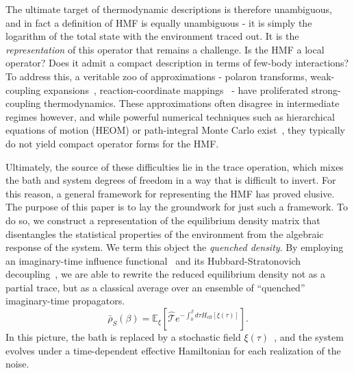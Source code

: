 The ultimate target of thermodynamic descriptions is therefore unambiguous, and in fact a definition of HMF is equally unambiguous - it is simply the logarithm of the total state with the environment traced out. It is the \emph{representation} of this operator that remains a challenge. Is the HMF a local operator? Does it admit a compact description in terms of few-body interactions? To address this, a veritable zoo of approximations - polaron transforms, weak-coupling expansions~\cite{cresserWeakUltrastrongCoupling2021a}, reaction-coordinate mappings~\cite{duGeneralizedHamiltonianMeanforce2025a,nazirReactionCoordinateMapping2018} - have proliferated strong-coupling thermodynamics. These approximations often disagree in intermediate regimes however, and while powerful numerical techniques such as hierarchical equations of motion (HEOM) or path-integral Monte Carlo exist~\cite{moixEquilibriumreducedDensityMatrix2012,chenRigorousStochasticMatrix2014,makriExploitingClassicalDecoherence2014,tanimuraReducedHierarchicalEquations2014,songCalculationCorrelatedInitial2015}, they typically do not yield compact operator forms for the HMF.

Ultimately, the source of these difficulties lie in the trace operation, which mixes the bath and system degrees of freedom in a way that is difficult to invert. For this reason, a general framework for representing the HMF has proved elusive. The purpose of this paper is to lay the groundwork for just such a framework. To do so, we construct a representation of the equilibrium density matrix that disentangles the statistical properties of the environment from the algebraic response of the system. We term this object the \emph{quenched density}. By employing an imaginary-time influence functional~\cite{feynmanTheoryGeneralQuantum1963a,caldeiraQuantumTunnellingDissipative1983a,grabertQuantumBrownianMotion1988} and its Hubbard-Stratonovich decoupling~\cite{hubbardCalculationPartitionFunctions1959a,stratonovich1957QDistro,stockburgerExactNumberRepresentation2002}, we are able to rewrite the reduced equilibrium density not as a partial trace, but as a classical average over an ensemble of ``quenched'' imaginary-time propagators.
\begin{equation}
    \bar{\rho}_S(\beta) = \mathbb{E}_{\xi}\left[ \hat{\mathcal{T}} e^{-\int_0^\beta d\tau H_{\mathrm{eff}}[\xi(\tau)]} \right].
\end{equation}
In this picture, the bath is replaced by a stochastic field $\xi(\tau)$~\cite{stockburgerSimulatingSpinbosonDynamics2004,mccaulPartitionfreeApproachOpen2017c,wiedmannNonMarkovianDynamicsQuantum2020}, and the system evolves under a time-dependent effective Hamiltonian for each realization of the noise.

